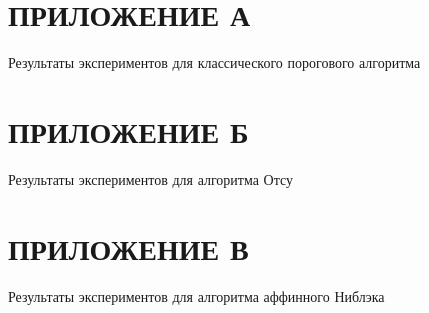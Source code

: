 \appendix
\renewcommand{\thesection}{\Asbuk{section}} 
\renewcommand{\thetable}{\thesection.\arabic{table}} 
\setcounter{table}{0}

\section*{ПРИЛОЖЕНИЕ А}
Результаты экспериментов для классического порогового алгоритма
\label{app:classicthresholding}



\section*{ПРИЛОЖЕНИЕ Б}
Результаты экспериментов для алгоритма Отсу
\label{app:otsu}



\section*{ПРИЛОЖЕНИЕ В}
Результаты экспериментов для алгоритма аффинного Ниблэка
\label{app:niblack}

